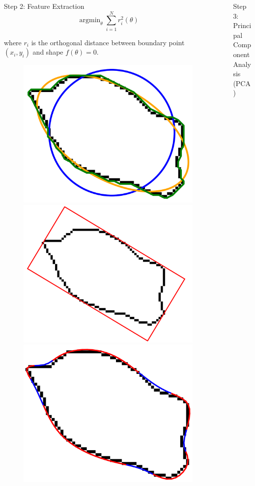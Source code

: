 \documentclass[final,hyperref={pdfpagelabels=false}]{beamer}
\DeclareMathOperator*{\argmin}{argmin}
\begin{document}
\begin{frame}[t]
\begin{columns}[t]
\begin{column}{.465\textwidth}
\begin{block}{Step 2: Feature Extraction}
$$\argmin_{\theta}\sum_{i=1}^{N}r_{i}^{2}(\theta)$$

where $r_{i}$ is the orthogonal distance between boundary point $(x_i,y_i)$  and shape $f(\theta)=0$.\\

\vspace{1em}

\begin{figure}
\captionsetup{labelformat=empty}
\includegraphics[height=0.27\linewidth]{MIAPaCa_40_CID7_1_transparent.png}
\includegraphics[height=0.27\linewidth]{MIAPaCa_40_CID7_2_transparent.png}
\includegraphics[height=0.27\linewidth]{MIAPaCa_40_CID7_4_transparent.png}
\end{figure}

\end{block}

\end{column} 

\begin{column}{.03\textwidth}\end{column} 

\begin{column}{.465\textwidth} 

\begin{block}{Step 3: Principal Component Analysis (PCA)}


\end{block}
\end{column}
\end{columns}
\end{frame}
\end{document}
